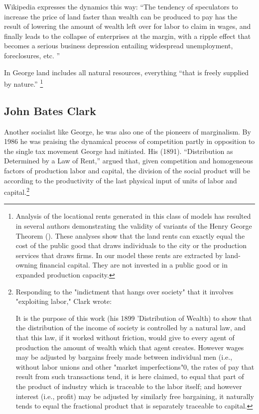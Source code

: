   Wikipedia expresses the dynamics this way: ``The tendency of speculators to increase the price of land faster than wealth can be produced to pay has the result of lowering the amount of wealth left over for labor to claim in wages, and finally leads to the collapse of enterprises at the margin, with a ripple effect that becomes a serious business depression entailing widespread unemployment, foreclosures, etc. ''
  
  In George land includes all natural resources, everything ``that is freely supplied by nature.''  
  \footnote{Analysis of the locational rents generated in this class of models has resulted in several authors demonstrating the validity of variants of the Henry George Theorem (\cite{Arnott-Stiglitz79, Arnott04, BehrensKanemoto14, JohnM.Hartwick1980THGR}). These analyses  show that the land rents can exactly equal the cost of the public good that draws individuals to the city or the production services that draws firms. In our model these rents are extracted by land-owning financial capital. They are not invested in a public good or in expanded production capacity.}
  
  \subsection{John Bates Clark}
  Another socialist like George, he was also one of the pioneers of marginalism. By 1986 he was praising the dynamical process of competition partly in opposition to the single tax movement George had initiated.  His (1891). ``Distribution as Determined by a Law of Rent,'' argued that, given  competition and homogeneous factors of production labor and capital, the division of the social product will be according to the productivity of the last physical input of units of labor and capital.\footnote{Responding to the "indictment that hangs over society" that it involves "exploiting labor," Clark wrote:

    It is the purpose of this work (his 1899 'Distribution of Wealth) to show that the distribution of the income of society is controlled by a natural law, and that this law, if it worked without friction, would give to every agent of production the amount of wealth which that agent creates. However wages may be adjusted by bargains freely made between individual men (i.e., without labor unions and other "market imperfections"0, the rates of pay that result from such transactions tend, it is here claimed, to equal that part of the product of industry which is traceable to the labor itself; and however interest (i.e., profit) may be adjusted by similarly free bargaining, it naturally tends to equal the fractional product that is separately traceable to capital.} 
  
